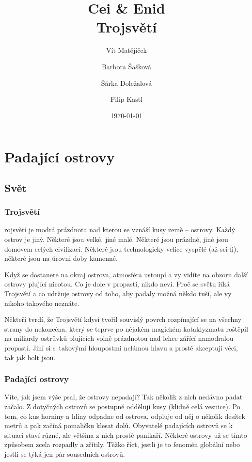 \documentclass[a4paper,twocolumn,openany,nodeprecatedcode, justified]{dndbook}
\title{
	Cei \& Enid\\
	\LARGE Trojsvětí
}
\author{Vít Matějíček \and Barbora Šašková \and Šárka Doležalová \and Filip Kastl}
\date{\today}
\begin{document}
	\DndSetThemeColor[BrGreen]
	
	\frontmatter
	
	\maketitle
	
	\tableofcontents
	
	\mainmatter%
	
	\part{Padající ostrovy}
	\chapter{Svět}
	\section{Trojsvětí}
	rojsvětí je modrá prázdnota nad kterou se vznáší kusy země -- ostrovy. Každý
	ostrov je jiný. Některé jsou velké, jiné malé. Některé jsou prázdné, jiné jsou
	domovem celých civilizací. Některé jsou technologicky velice vyspělé (až sci-fi),
	některé jsou na úrovni doby kamenné.
	
	Když se dostanete na okraj ostrova, atmosféra ustoupí a vy vidíte na obzoru
	další ostrovy plující nicotou. Co je dole v propasti, nikdo neví. Proč se světu
	říká Trojsvětí a co udržuje ostrovy od toho, aby padaly možná někdo tuší, ale
	vy nikoho takového neznáte.
	
	Někteří tvrdí, že Trojsvětí kdysi tvořil souvislý povrch rozpínající se na všechny strany do nekonečna, který se teprve po nějakém magickém kataklyzmatu roštěpil na miliardy ostrůvků plujících volně prázdnotou nad lehce zářící namodralou propastí. Jiní si s~takovými hloupostmi nelámou hlavu a prostě akceptují věci, tak jak holt jsou.
	
	\section{Padající ostrovy}
	Víte, jak jsem výše psal, že ostrovy nepadají? Tak několik z nich nedávno padat
	začalo. Z dotyčných ostrovů se postupně oddělují kusy (klidně celá vesnice). Po
	tom, co kus horniny a hlíny odpadne od ostrova, odpluje od něj o několik desítek
	metrů a pak začíná pomaličku klesat dolů. Obyvatelé padajících ostrovů se k
	situaci staví různé, ale většina z nich prostě panikaří. Některé ostrovy už se
	tímto způsobem zcela rozpadly a zřítily. Těžko říct, jestli je to fenomén globální
	nebo jestli se týká jen pár sousedních ostrovů.
	
\end{document}
